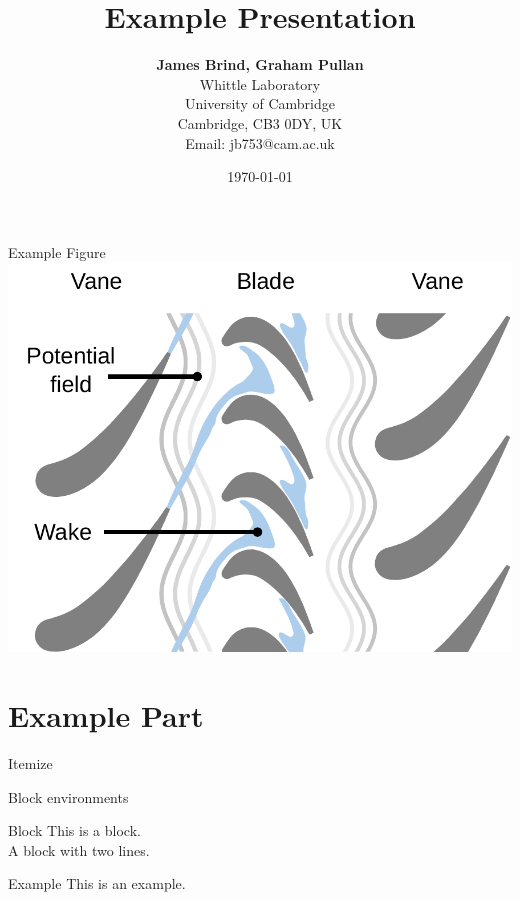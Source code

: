 \documentclass[unknownkeysallowed]{beamer}
\title{Example Presentation}
\author{\normalsize\textbf{James Brind, Graham Pullan} \\ 
Whittle Laboratory \\
University of Cambridge \\
Cambridge, CB3 0DY, UK \\
Email: jb753@cam.ac.uk}
\date{\normalsize\today}
\begin{document}
\begin{frame}
  \titlepage
\end{frame}

\begin{frame}{Example Figure}
  \centering
  \includegraphics[width=0.9\linewidth,trim={0 1.5cm 0 0},clip]{figures/blade_row_interactions.pdf}
\end{frame}

\part{Example Part}
\frame{\partpage}

\begin{frame}{Itemize}
\end{frame}

\begin{frame}{Block environments}
  \begin{block}{Block}
    This is a block.\\
    A block with two lines.
  \end{block}
  \begin{exampleblock}{Example}
    This is an example.
  \end{exampleblock}

\end{frame}
\end{document}
